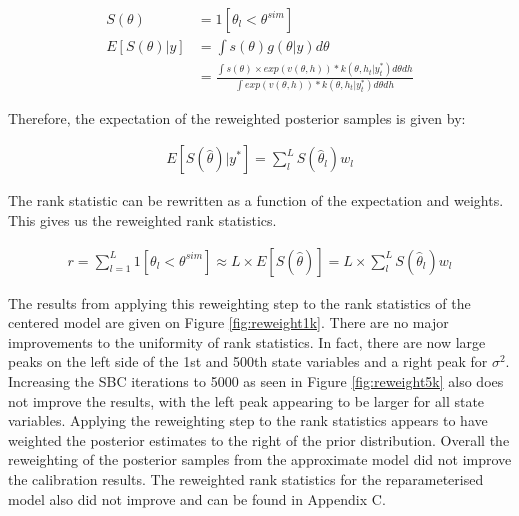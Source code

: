 \documentclass[12pt, a4paper]{article}
\begin{document}
    $$
    \begin{aligned}
    S(\theta) &= 1[\theta_l < \theta^{sim}] \\
    E[S(\theta) | y] &= \int s(\theta) g(\theta | y) d\theta\\ 
    &= \frac{\int s(\theta)\times exp(v(\theta, h)) * k(\theta, h_t | y^{\ast}_t)d\theta d h}{\int exp(v(\theta, h)) * k(\theta, h_t | y^{\ast}_t)d\theta d h} 
    \end{aligned}
    $$

    Therefore, the expectation of the reweighted posterior samples is given by:

    $$
    \begin{aligned}
    E[S(\hat{\theta}) | y^{\ast}] = \sum_l^L S(\hat{\theta}_l)w_l
    \end{aligned}
    $$

    The rank statistic can be rewritten as a function of the expectation and weights. This gives us the reweighted rank statistics.

    $$
    \begin{aligned}
    r = \sum_{l=1}^{L}1[\theta_{l} < \theta^{sim}] \approx  L\times E[S(\hat{\theta})] = L\times \sum_l^L S(\hat{\theta}_l)w_l
    \end{aligned}
    $$

    The results from applying this reweighting step to the rank statistics of the centered model are given on Figure \ref{fig:reweight1k}. There are no major improvements to the uniformity of rank statistics. In fact, there are now large peaks on the left side of the 1st and 500th state variables and a right peak for $\sigma^2$. Increasing the SBC iterations to 5000 as seen in Figure \ref{fig:reweight5k} also does not improve the results, with the left peak appearing to be larger for all state variables. Applying the reweighting step to the rank statistics appears to have weighted the posterior estimates to the right of the prior distribution. Overall the reweighting of the posterior samples from the approximate model did not improve the calibration results. The reweighted rank statistics for the reparameterised model also did not improve and can be found in Appendix C.
\end{document}
